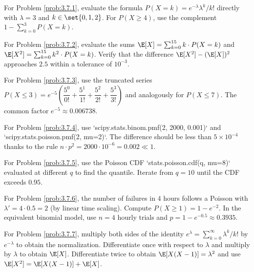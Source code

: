 \begin{sugerencia}
	\label{sug:3.7.1}
	For Problem \ref{prob:3.7.1}, evaluate the formula $P(X=k) = e^{-\lambda}\lambda^{k}/k!$ directly with $\lambda = 3$ and $k \in \set{0, 1, 2}$. For $P(X \ge 4)$, use the complement $1 - \sum_{k=0}^{3} P(X=k)$.
\end{sugerencia}

\begin{sugerencia}
	\label{sug:3.7.2}
	For Problem \ref{prob:3.7.2}, evaluate the sums $\E[X] = \sum_{k=0}^{15} k \cdot P(X=k)$ and $\E[X^{2}] = \sum_{k=0}^{15} k^{2} \cdot P(X=k)$. Verify that the difference $\E[X^{2}] - (\E[X])^{2}$ approaches $2.5$ within a tolerance of $10^{-3}$.
\end{sugerencia}

\begin{sugerencia}
	\label{sug:3.7.3}
	For Problem \ref{prob:3.7.3}, use the truncated series $P(X \le 3) = e^{-5}\left(\dfrac{5^{0}}{0!} + \dfrac{5^{1}}{1!} + \dfrac{5^{2}}{2!} + \dfrac{5^{3}}{3!}\right)$ and analogously for $P(X \le 7)$. The common factor $e^{-5} \approx 0.006738$.
\end{sugerencia}

\begin{sugerencia}
	\label{sug:3.7.4}
	For Problem \ref{prob:3.7.4}, use `scipy.stats.binom.pmf(2, 2000, 0.001)` and `scipy.stats.poisson.pmf(2, mu=2)`. The difference should be less than $5 \times 10^{-4}$ thanks to the rule $n \cdot p^{2} = 2000 \cdot 10^{-6} = 0.002 \ll 1$.
\end{sugerencia}

\begin{sugerencia}
	\label{sug:3.7.5}
	For Problem \ref{prob:3.7.5}, use the Poisson CDF `stats.poisson.cdf(q, mu=8)` evaluated at different $q$ to find the quantile. Iterate from $q = 10$ until the CDF exceeds $0.95$.
\end{sugerencia}

\begin{sugerencia}
	\label{sug:3.7.6}
	For Problem \ref{prob:3.7.6}, the number of failures in $4$ hours follows a Poisson with $\lambda' = 4 \cdot 0.5 = 2$ (by linear time scaling). Compute $P(X \ge 1) = 1 - e^{-2}$. In the equivalent binomial model, use $n=4$ hourly trials and $p = 1 - e^{-0.5} \approx 0.3935$.
\end{sugerencia}

\begin{sugerencia}
	\label{sug:3.7.7}
	For Problem \ref{prob:3.7.7}, multiply both sides of the identity $e^{\lambda} = \sum_{k=0}^{\infty} \lambda^{k}/k!$ by $e^{-\lambda}$ to obtain the normalization. Differentiate once with respect to $\lambda$ and multiply by $\lambda$ to obtain $\E[X]$. Differentiate twice to obtain $\E[X(X-1)] = \lambda^{2}$ and use $\E[X^{2}] = \E[X(X-1)] + \E[X]$.
\end{sugerencia}

